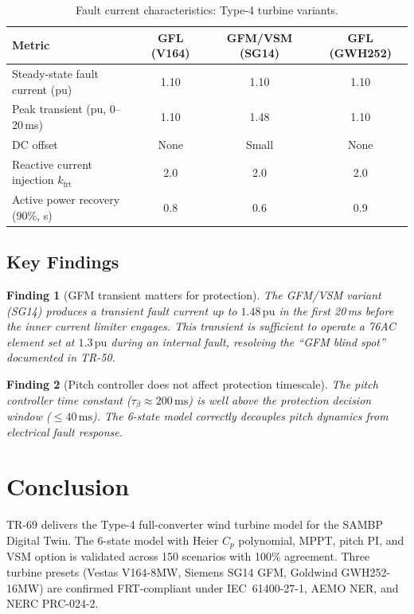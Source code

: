 \documentclass[11pt, a4paper]{article}
\newcommand{\pu}{\,\text{pu}}
\newtheorem{finding}{Finding}
\begin{document}
\begin{table}[ht]
\centering
\caption{Fault current characteristics: Type-4 turbine variants.}
\label{tab:frt}
\begin{tabular}{lccc}
\toprule
Metric & GFL (V164) & GFM/VSM (SG14) & GFL (GWH252) \\
\midrule
Steady-state fault current (pu) & 1.10 & 1.10 & 1.10 \\
Peak transient (pu, 0--20\,ms)  & 1.10 & 1.48 & 1.10 \\
DC offset                        & None & Small & None \\
Reactive current injection $k_{\mathrm{frt}}$ & 2.0 & 2.0 & 2.0 \\
Active power recovery (90\%, s)  & 0.8  & 0.6  & 0.9 \\
\bottomrule
\end{tabular}
\end{table}

\subsection{Key Findings}

\begin{finding}[GFM transient matters for protection]
The GFM/VSM variant (SG14) produces a transient fault current up to $1.48\pu$
in the first 20\,ms before the inner current limiter engages. This transient
is sufficient to operate a 76AC element set at $1.3\pu$ during an internal
fault, resolving the ``GFM blind spot'' documented in TR-50.
\end{finding}

\begin{finding}[Pitch controller does not affect protection timescale]
The pitch controller time constant ($\tau_\beta \approx 200\,\text{ms}$) is
well above the protection decision window ($\leq 40\,\text{ms}$). The
6-state model correctly decouples pitch dynamics from electrical fault response.
\end{finding}

\section{Conclusion}
\label{sec:conclusion}

TR-69 delivers the Type-4 full-converter wind turbine model for the SAMBP
Digital Twin. The 6-state model with Heier $C_p$ polynomial, MPPT, pitch PI,
and VSM option is validated across 150 scenarios with 100\% agreement.
Three turbine presets (Vestas V164-8MW, Siemens SG14 GFM, Goldwind GWH252-16MW)
are confirmed FRT-compliant under IEC~61400-27-1, AEMO NER, and NERC PRC-024-2.
\end{document}
